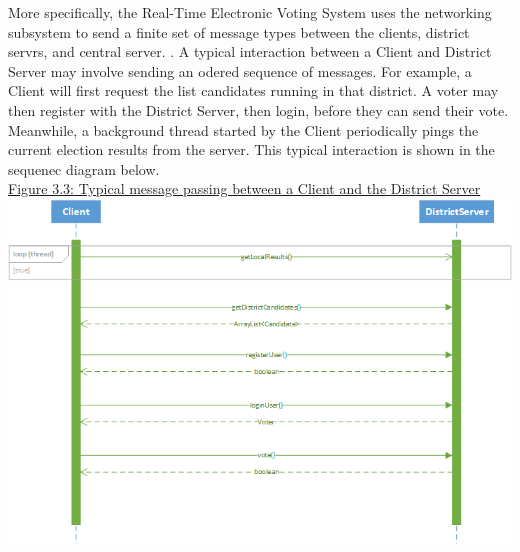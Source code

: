 \documentclass[11pt,english]{article}
\begin{document}
\noindent More specifically, the Real-Time Electronic Voting System uses the networking subsystem to
send a finite set of message types between the clients, district servrs, and central server.
. A typical interaction between a Client and District
Server may involve sending an odered sequence of messages. For example, a Client will
first request the list candidates running in that district. A voter may then
register with the District Server, then login, before they can send their vote.
Meanwhile, a background thread started by the Client periodically pings the current
election results from the server. This typical interaction is shown in the sequenec
diagram below. 
\vspace{10mm} \\
\underline{Figure 3.3: Typical message passing between a Client and the District Server}
\vspace{5mm}\\
\includegraphics[width=7in]{figures/MSC.png}
\end{document}
